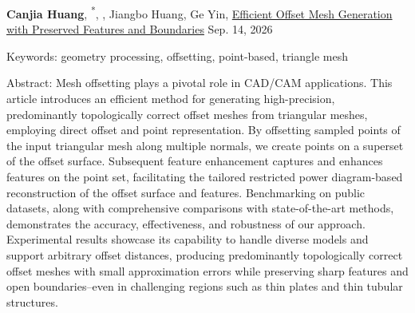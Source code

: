 
\begin{cventries}

  \cventry
    {\textbf{Canjia Huang}, \JuanCao\textsuperscript{*}, \BailinDeng, Jiangbo Huang, Ge Yin, \ZhongguiChen}
    {\href{https://dl.acm.org/doi/10.1145/3832781}{Efficient Offset Mesh Generation with Preserved Features and Boundaries}}
    {\ACMTOG}
    {Sep. 14, 2026}
    {
        \begin{cvitems}
          \item Keywords: geometry processing, offsetting, point-based, triangle mesh
          \item \setlength{\acvfigindent}{\leftmargin}%
          \setlength{\acvfigfirstindent}{\leftmargin}%
          Abstract: Mesh offsetting plays a pivotal role in CAD/CAM applications. This article introduces an efficient method for generating high-precision, predominantly topologically correct offset meshes from triangular meshes, employing direct offset and point representation. By offsetting sampled points of the input triangular mesh along multiple normals, we create points on a superset of the offset surface. Subsequent feature enhancement captures and enhances features on the point set, facilitating the tailored restricted power diagram-based reconstruction of the offset surface and features. Benchmarking on public datasets, along with comprehensive comparisons with state-of-the-art methods, demonstrates the accuracy, effectiveness, and robustness of our approach. Experimental results showcase its capability to handle diverse models and support arbitrary offset distances, producing predominantly topologically correct offset meshes with small approximation errors while preserving sharp features and open boundaries–even in challenging regions such as thin plates and thin tubular structures.\cvpar
        \end{cvitems}
    }


\end{cventries}
